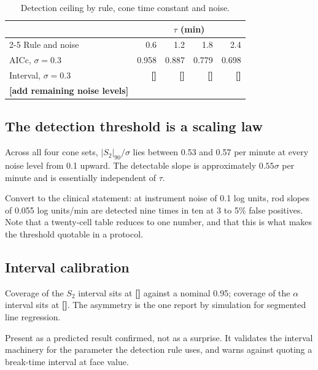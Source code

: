 \documentclass[11pt,a4paper]{article}
\newcommand{\FILL}[1]{\textbf{\textcolor{coneC}{[#1]}}}
\newcommand{\Sii}{S_2}
\begin{document}
\begin{table}[h]
\centering
\caption{Detection ceiling by rule, cone time constant and noise.}
\begin{tabular}{lrrrr}
\toprule
& \multicolumn{4}{c}{$\tau$ (min)} \\
\cmidrule(l){2-5}
Rule and noise & 0.6 & 1.2 & 1.8 & 2.4 \\
\midrule
AICc, $\sigma=0.3$ & 0.958 & 0.887 & 0.779 & 0.698 \\
Interval, $\sigma=0.3$ & \FILL{} & \FILL{} & \FILL{} & \FILL{} \\
\FILL{add remaining noise levels} & & & & \\
\bottomrule
\end{tabular}
\end{table}

\subsection{The detection threshold is a scaling law}
\begin{evidence}
Across all four cone sets, $|\Sii|_{90}/\sigma$ lies between 0.53 and 0.57
per minute at every noise level from 0.1 upward. The detectable slope is
approximately $0.55\sigma$ per minute and is essentially independent of
$\tau$.
\end{evidence}
\begin{towrite}
Convert to the clinical statement: at instrument noise of 0.1 log units, rod
slopes of 0.055 log units/min are detected nine times in ten at 3 to 5\%
false positives. Note that a twenty-cell table reduces to one number, and
that this is what makes the threshold quotable in a protocol.
\end{towrite}

\subsection{Interval calibration}
\label{sec:ci}
\begin{evidence}
Coverage of the $\Sii$ interval sits at \FILL{} against a nominal 0.95;
coverage of the $\alpha$ interval sits at \FILL{}. The asymmetry is the one
\citet{Kim:2008aa} report by simulation for segmented line regression.
\end{evidence}
\begin{towrite}
Present as a predicted result confirmed, not as a surprise. It validates the
interval machinery for the parameter the detection rule uses, and warns
against quoting a break-time interval at face value.
\end{towrite}
\end{document}
